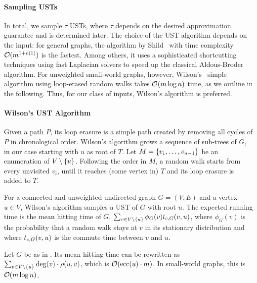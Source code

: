 \paragraph{Sampling USTs}
In total, we sample $\tau$ USTs, where $\tau$ depends on the desired approximation guarantee and
is determined later. The choice of the UST algorithm depends on the input: for general graphs,
the algorithm by Shild~\cite{DBLP:conf/stoc/Schild18} with time complexity $\mathcal{O}(m^{1 + o(1)})$
is the fastest. Among others, it uses a sophisticated shortcutting techniques using fast Laplacian
solvers to speed up the classical
Aldous-Broder~\cite{DBLP:journals/siamdm/Aldous90,DBLP:conf/focs/Broder89}
algorithm. For unweighted small-world graphs, however, Wilson's~\cite{DBLP:conf/stoc/Wilson96}
simple algorithm using loop-erased
random walks takes $\mathcal{O}(m\log n)$ time, as we outline in the following. Thus, for our class of
inputs, Wilson's algorithm is preferred.

\paragraph{Wilson's UST Algorithm}
Given a path $P$, its loop erasure is a simple path created by removing all cycles of $P$
in chronological order. Wilson's algorithm grows a sequence of sub-trees of $G$, in our case
starting with $u$ as root of $T$. Let $M = \set{v_1, \ldots, v_{n - 1}}$ be an enumeration of
$V\setminus\set{u}$. Following the order in $M$, a random walk starts from every unvisited $v_i$,
until it reaches (some vertex in) $T$ and its loop erasure is added to $T$.

\begin{proposition}
\label{prop:el-clos:wilson}
For a connected and unweighted undirected graph $G = (V, E)$ and a vertex $u \in V$, Wilson's
algorithm samples a UST of $G$ with root $u$. The expected running time is the mean hitting
time of $G$, $\sum_{v \in V\setminus\set{u}}\phi_G(v)\ctg(v, u)$, where $\phi_G(v)$ is the
probability that a random walk stays at $v$ in its stationary distribution and where
$t_{c, G}(v, u)$ is the commute time between $v$ and $u$.
\end{proposition}

\begin{lemma}
Let $G$ be as in . Its mean hitting time can be rewritten as
$\sum_{v \in V \setminus\set{u}}\deg(v)\cdot\rdist(u, v)$, which is $\mathcal{O}(\text{ecc}(u)\cdot m)$.
In small-world graphs, this is $\mathcal{O}(m\log n)$.
\end{lemma}

